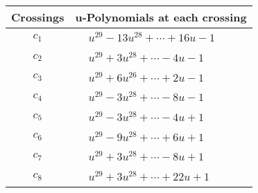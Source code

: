 \documentclass[1p]{elsarticle_modified}
\theoremstyle{definition}
\begin{document}
\begin{tabular}{m{50pt}|m{274pt}}
Crossings & \hspace{64pt}u-Polynomials at each crossing \\
\hline $$\begin{aligned}c_{1}\end{aligned}$$&$\begin{aligned}
&u^{29}-13 u^{28}+\cdots+16 u-1
\end{aligned}$\\
\hline $$\begin{aligned}c_{2}\end{aligned}$$&$\begin{aligned}
&u^{29}+3 u^{28}+\cdots-4 u-1
\end{aligned}$\\
\hline $$\begin{aligned}c_{3}\end{aligned}$$&$\begin{aligned}
&u^{29}+6 u^{26}+\cdots+2 u-1
\end{aligned}$\\
\hline $$\begin{aligned}c_{4}\end{aligned}$$&$\begin{aligned}
&u^{29}-3 u^{28}+\cdots-8 u-1
\end{aligned}$\\
\hline $$\begin{aligned}c_{5}\end{aligned}$$&$\begin{aligned}
&u^{29}-3 u^{28}+\cdots-4 u+1
\end{aligned}$\\
\hline $$\begin{aligned}c_{6}\end{aligned}$$&$\begin{aligned}
&u^{29}-9 u^{28}+\cdots+6 u+1
\end{aligned}$\\
\hline $$\begin{aligned}c_{7}\end{aligned}$$&$\begin{aligned}
&u^{29}+3 u^{28}+\cdots-8 u+1
\end{aligned}$\\
\hline $$\begin{aligned}c_{8}\end{aligned}$$&$\begin{aligned}
&u^{29}+3 u^{28}+\cdots+22 u+1
\end{aligned}$\\

\end{tabular}
\end{document}
